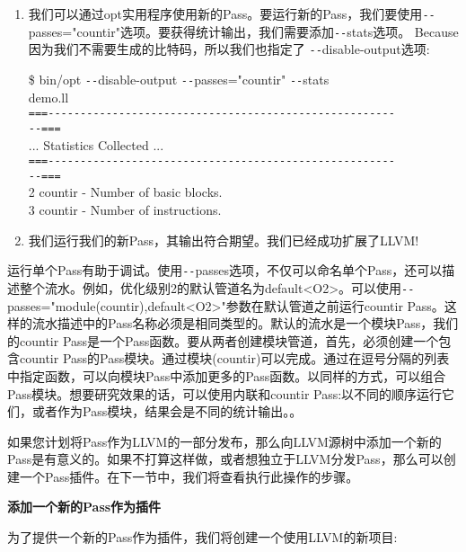 \begin{enumerate}
	\item 我们可以通过opt实用程序使用新的Pass。要运行新的Pass，我们要使用\verb|--|passes="countir"选项。要获得统计输出，我们需要添加\verb|--|stats选项。 Because 因为我们不需要生成的比特码，所以我们也指定了 \verb|--|disable-output选项:
	\begin{tcolorbox}[colback=white,colframe=black]
		\$ bin/opt \verb|--|disable-output \verb|--|passes="countir" \verb|--|stats  \\
		demo.ll \\
		\verb|===------------------------------------------------------| \\
		\verb|--===| \\
		... Statistics Collected ... \\
		\verb|===------------------------------------------------------| \\
		\verb|--===| \\
		2 countir - Number of basic blocks. \\
		3 countir - Number of instructions.
	\end{tcolorbox}
	
	\item 我们运行我们的新Pass，其输出符合期望。我们已经成功扩展了LLVM!
	
\end{enumerate}

运行单个Pass有助于调试。使用\verb|--|passes选项，不仅可以命名单个Pass，还可以描述整个流水。例如，优化级别2的默认管道名为default<O2>。可以使用\verb|--|passes="module(countir),default<O2>"参数在默认管道之前运行countir Pass。这样的流水描述中的Pass名称必须是相同类型的。默认的流水是一个模块Pass，我们的countir Pass是一个Pass函数。要从两者创建模块管道，首先，必须创建一个包含countir Pass的Pass模块。通过模块(countir)可以完成。通过在逗号分隔的列表中指定函数，可以向模块Pass中添加更多的Pass函数。以同样的方式，可以组合Pass模块。想要研究效果的话，可以使用内联和countir Pass:以不同的顺序运行它们，或者作为Pass模块，结果会是不同的统计输出。。\par

如果您计划将Pass作为LLVM的一部分发布，那么向LLVM源树中添加一个新的Pass是有意义的。如果不打算这样做，或者想独立于LLVM分发Pass，那么可以创建一个Pass插件。在下一节中，我们将查看执行此操作的步骤。\par


\hspace*{\fill} \par %
\textbf{添加一个新的Pass作为插件}

为了提供一个新的Pass作为插件，我们将创建一个使用LLVM的新项目:\par

